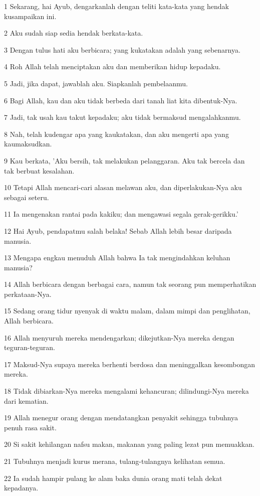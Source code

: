 \par 1 Sekarang, hai Ayub, dengarkanlah dengan teliti kata-kata yang hendak kusampaikan ini.
\par 2 Aku sudah siap sedia hendak berkata-kata.
\par 3 Dengan tulus hati aku berbicara; yang kukatakan adalah yang sebenarnya.
\par 4 Roh Allah telah menciptakan aku dan memberikan hidup kepadaku.
\par 5 Jadi, jika dapat, jawablah aku. Siapkanlah pembelaanmu.
\par 6 Bagi Allah, kau dan aku tidak berbeda dari tanah liat kita dibentuk-Nya.
\par 7 Jadi, tak usah kau takut kepadaku; aku tidak bermaksud mengalahkanmu.
\par 8 Nah, telah kudengar apa yang kaukatakan, dan aku mengerti apa yang kaumaksudkan.
\par 9 Kau berkata, 'Aku bersih, tak melakukan pelanggaran. Aku tak bercela dan tak berbuat kesalahan.
\par 10 Tetapi Allah mencari-cari alasan melawan aku, dan diperlakukan-Nya aku sebagai seteru.
\par 11 Ia mengenakan rantai pada kakiku; dan mengawasi segala gerak-gerikku.'
\par 12 Hai Ayub, pendapatmu salah belaka! Sebab Allah lebih besar daripada manusia.
\par 13 Mengapa engkau menuduh Allah bahwa Ia tak mengindahkan keluhan manusia?
\par 14 Allah berbicara dengan berbagai cara, namun tak seorang pun memperhatikan perkataan-Nya.
\par 15 Sedang orang tidur nyenyak di waktu malam, dalam mimpi dan penglihatan, Allah berbicara.
\par 16 Allah menyuruh mereka mendengarkan; dikejutkan-Nya mereka dengan teguran-teguran.
\par 17 Maksud-Nya supaya mereka berhenti berdosa dan meninggalkan kesombongan mereka.
\par 18 Tidak dibiarkan-Nya mereka mengalami kehancuran; dilindungi-Nya mereka dari kematian.
\par 19 Allah menegur orang dengan mendatangkan penyakit sehingga tubuhnya penuh rasa sakit.
\par 20 Si sakit kehilangan nafsu makan, makanan yang paling lezat pun memuakkan.
\par 21 Tubuhnya menjadi kurus merana, tulang-tulangnya kelihatan semua.
\par 22 Ia sudah hampir pulang ke alam baka dunia orang mati telah dekat kepadanya.
